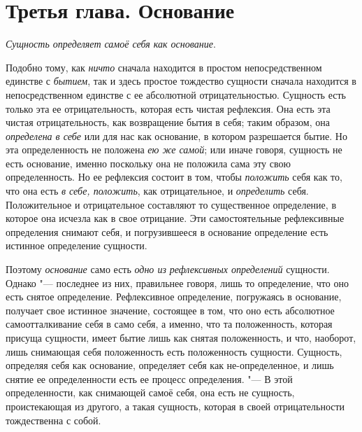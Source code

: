 \chapter[{\em Третья глава} Основание]{Третья глава. Основание}
{\em Сущность определяет самоё себя как основание}.

Подобно тому, как {\em ничто} сначала находится в
простом непосредственном единстве с {\em бытием}, так и
здесь простое тождество сущности сначала находится в непосредственном
единстве с ее абсолютной отрицательностью. Сущность есть только эта ее
отрицательность, которая есть чистая рефлексия. Она есть эта чистая
отрицательность, как возвращение бытия в себя; таким образом, она
{\em определена в себе} или для нас как основание, в
котором разрешается бытие. Но эта определенность не положена
{\em ею же самой}; или иначе говоря, сущность не есть
основание, именно поскольку она не положила сама эту свою определенность.
Но ее рефлексия состоит в том, чтобы {\em положить}
себя как то, что она есть {\em в себе, положить}, как
отрицательное, и {\em определить} себя. Положительное и
отрицательное составляют то существенное определение, в которое она исчезла
как в свое отрицание. Эти самостоятельные рефлексивные определения снимают
себя, и погрузившееся в основание определение есть истинное определение
сущности.

Поэтому {\em основание} само есть
{\em одно из рефлексивных определений} сущности. Однако
"--- последнее из них, правильнее говоря, лишь то определение, что оно есть
снятое определение. Рефлексивное определение, погружаясь в основание,
получает свое истинное значение, состоящее в том, что оно есть абсолютное
самоотталкивание себя в само себя, а именно, что та положенность, которая
присуща сущности, имеет бытие лишь как снятая положенность, и что,
наоборот, лишь снимающая себя положенность есть положенность сущности.
Сущность, определяя себя как основание, определяет себя как
не-определенное, и лишь снятие ее определенности есть ее процесс
определения. "--- В этой определенности, как снимающей самоё себя, она есть не
сущность, проистекающая из другого, а такая сущность, которая в своей
отрицательности тождественна с собой.

